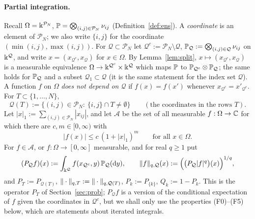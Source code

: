 \paragraph{Partial integration.} Recall $\Omega=\Bbbk^{\mathcal P_N}$, $\mathbb{P}=\bigotimes_{(i,j)\in\mathcal P_N}\nu_{ij}$ (Definition~\ref{def:ens}). A \emph{coordinate} is an element of $\mathcal P_N$; we also write $\{i,j\}$ for the coordinate $(\min(i,j),\max(i,j))$.
For $\mathcal Q\subset\mathcal P_N$ let $\mathcal Q^c:=\mathcal P_N\setminus\mathcal Q$, $\mathbb{P}_{\mathcal Q}:=\bigotimes_{(i,j)\in\mathcal Q}\nu_{ij}$ on $\Bbbk^{\mathcal Q}$, and write $x=(x_{\mathcal Q^c},x_{\mathcal Q})$ for $x\in\Omega$.
By Lemma~\ref{lem:split}, $x\mapsto(x_{\mathcal Q^c},x_{\mathcal Q})$ is a measurable equivalence $\Omega\to\Bbbk^{\mathcal Q^c}\times\Bbbk^{\mathcal Q}$ which maps $\mathbb{P}$ to $\mathbb{P}_{\mathcal Q^c}\otimes\mathbb{P}_{\mathcal Q}$; the same holds
for $\mathbb{P}_{\mathcal Q}$ and a subset $\mathcal Q_1\subset\mathcal Q$ (it is the same statement for the index set $\mathcal Q$).
A function $f$ on $\Omega$ \emph{does not depend on $\mathcal Q$} if $f(x)=f(x')$ whenever $x_{\mathcal Q^c}=x'_{\mathcal Q^c}$. For $T\subset\{1,\dots,N\}$,
\[
 \mathcal Q(T):=\big\{(i,j)\in\mathcal P_N:\ \{i,j\}\cap T\ne\emptyset\big\}\qquad(\text{the coordinates in the rows }T).
\]
Let $|x|_1:=\sum_{(i,j)\in\mathcal P_N}|x_{ij}|$, and let $\mathcal A$ be the set of all measurable $f:\Omega\to\mathbb{C}$ for which there are $c,m\in[0,\infty)$ with
\begin{equation}\label{eq:classA}
 |f(x)|\le c\,(1+|x|_1)^m\qquad\text{for all }x\in\Omega .
\end{equation}
For $f\in\mathcal A$, or $f:\Omega\to[0,\infty]$ measurable, and for real $q\ge1$ put
\begin{equation}\label{eq:PQ}
 (P_{\mathcal Q}f)(x):=\int_{\Bbbk^{\mathcal Q}}f(x_{\mathcal Q^c},y)\,\mathbb{P}_{\mathcal Q}(\mathrm{d} y),\qquad\|f\|_{q,\mathcal Q}(x):=\Big(\big(P_{\mathcal Q}|f|^q\big)(x)\Big)^{1/q},
\end{equation}
and $P_T:=P_{\mathcal Q(T)}$, $\|\cdot\|_{q,T}:=\|\cdot\|_{q,\mathcal Q(T)}$, $P_k:=P_{\{k\}}$, $Q_k:=1-P_k$. This is the operator $P_T$ of Section~\ref{sec:prob}; $P_{\mathcal Q}f$ is a version of the conditional expectation of $f$
given the coordinates in $\mathcal Q^c$, but we shall only use the properties (F0)--(F5) below, which are statements about iterated integrals.

